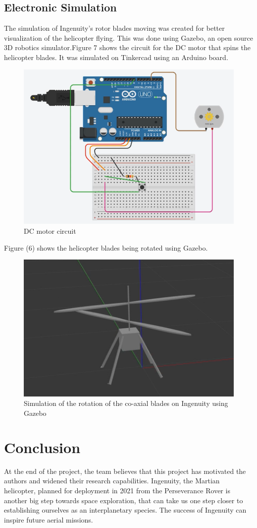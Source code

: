 \documentclass[preprint,12pt]{elsarticle}
\begin{document}
\subsection{\textbf{Electronic Simulation}}
The simulation of Ingenuity’s rotor blades moving was created for better visualization of the helicopter flying. This was done using Gazebo, an open source 3D robotics simulator.Figure 7 shows the circuit for the DC motor that spins the helicopter blades. It was simulated on Tinkercad using an Arduino board.
\begin{figure}[H]
\centering\includegraphics[width=0.69\linewidth]{dc motor ckt.png}
\caption{DC motor circuit}
\end{figure}
Figure (6) shows the helicopter blades being rotated using Gazebo.
\begin{figure}[H]
\centering\includegraphics[width=0.69\linewidth]{gazebo sim.png}
\caption{Simulation of the rotation of the co-axial blades on Ingenuity using Gazebo}
\end{figure}

\section{\textbf{Conclusion}}
At the end of the project, the team believes that this project has motivated the authors and widened their research capabilities. 
Ingenuity, the Martian helicopter, planned for deployment in 2021 from the Perseverance Rover is another big step towards space exploration, that can take us one step closer to establishing ourselves as an interplanetary species. The success of Ingenuity can inspire future aerial missions.
\end{document}
